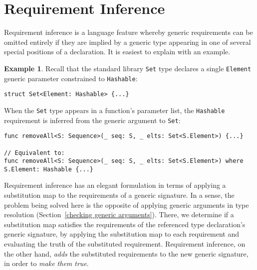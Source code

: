 \documentclass[a4paper,headsepline,bibliography=totoc,toc=flat,fleqn,twoside=semi]{scrbook}
\theoremstyle{definition}
\theoremstyle{definition}
\newtheorem{example}{Example}[chapter]
\theoremstyle{definition}
\newcommand{\ifWIP}{\iffalse}
\begin{document}
\section{Requirement Inference}\label{requirementinference}

\ifWIP
Requirement inference is a language feature whereby generic requirements can be omitted entirely if they are implied by a generic type appearing in one of several special positions of a declaration. It is easiest to explain with an example.
\begin{example}\label{requirementinferenceexample1}
Recall that the standard library \texttt{Set} type declares a single \texttt{Element} generic parameter constrained to \texttt{Hashable}:
\begin{Verbatim}
struct Set<Element: Hashable> {...}
\end{Verbatim}
When the \texttt{Set} type appears in a function's parameter list, the \texttt{Hashable} requirement is inferred from the generic argument to \texttt{Set}:
\begin{Verbatim}
func removeAll<S: Sequence>(_ seq: S, _ elts: Set<S.Element>) {...}

// Equivalent to:
func removeAll<S: Sequence>(_ seq: S, _ elts: Set<S.Element>) where S.Element: Hashable {...}
\end{Verbatim}
\end{example}

Requirement inference has an elegant formulation in terms of applying a substitution map to the requirements of a generic signature. In a sense, the problem being solved here is the opposite of applying generic arguments in type resolution (Section~\ref{checking generic arguments}). There, we determine if a substitution map satisfies the requirements of the referenced type declaration's generic signature, by applying the substitution map to each requirement and evaluating the truth of the substituted requirement. Requirement inference, on the other hand, \emph{adds} the substituted requirements to the new generic signature, in order to \emph{make them true}.
\end{document}
